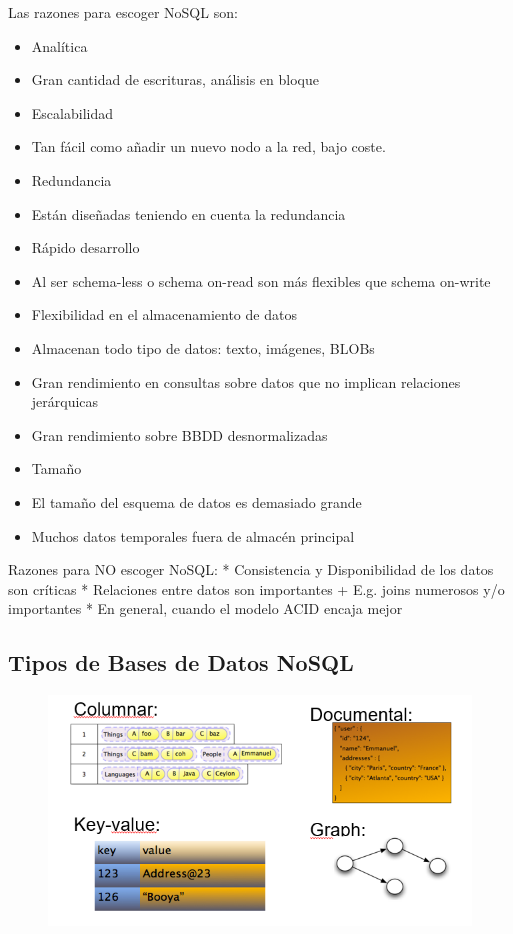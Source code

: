 \documentclass[]{book}
\providecommand{\tightlist}{%
  \setlength{\itemsep}{0pt}\setlength{\parskip}{0pt}}
\begin{document}
Las razones para escoger NoSQL son:

\begin{itemize}
\tightlist
\item
  Analítica
\item
  Gran cantidad de escrituras, análisis en bloque
\item
  Escalabilidad
\item
  Tan fácil como añadir un nuevo nodo a la red, bajo coste.
\item
  Redundancia
\item
  Están diseñadas teniendo en cuenta la redundancia
\item
  Rápido desarrollo
\item
  Al ser schema-less o schema on-read son más flexibles que schema
  on-write
\item
  Flexibilidad en el almacenamiento de datos
\item
  Almacenan todo tipo de datos: texto, imágenes, BLOBs
\item
  Gran rendimiento en consultas sobre datos que no implican relaciones
  jerárquicas
\item
  Gran rendimiento sobre BBDD desnormalizadas
\item
  Tamaño
\item
  El tamaño del esquema de datos es demasiado grande
\item
  Muchos datos temporales fuera de almacén principal
\end{itemize}

Razones para NO escoger NoSQL: * Consistencia y Disponibilidad de los
datos son críticas * Relaciones entre datos son importantes + E.g. joins
numerosos y/o importantes * En general, cuando el modelo ACID encaja
mejor

\subsection{Tipos de Bases de Datos
NoSQL}\label{tipos-de-bases-de-datos-nosql}

\begin{figure}
\centering
\includegraphics{images/TiposBBDDNoSQL.png}
\caption{}
\end{figure}
\end{document}
